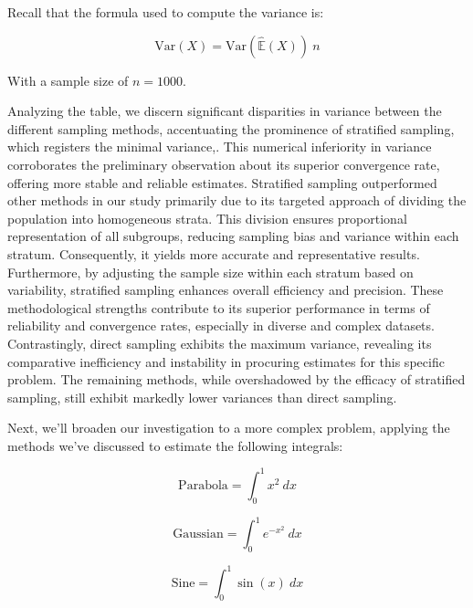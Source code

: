 \documentclass{report}
\begin{document}
Recall that the formula used to compute the variance is:

\begin{equation*} \mathrm{Var}(X) = \mathrm{Var}(\hat{\mathbb{E}}(X)) \ n \end{equation*}

With a sample size of \(n = 1000\).

Analyzing the table, we discern significant disparities in variance between the different sampling methods, accentuating the prominence of stratified sampling, which registers the minimal variance,. This numerical inferiority in variance corroborates the preliminary observation about its superior convergence rate, offering more stable and reliable estimates. Stratified sampling outperformed other methods in our study primarily due to its targeted approach of dividing the population into homogeneous strata. This division ensures proportional representation of all subgroups, reducing sampling bias and variance within each stratum. Consequently, it yields more accurate and representative results. Furthermore, by adjusting the sample size within each stratum based on variability, stratified sampling enhances overall efficiency and precision. These methodological strengths contribute to its superior performance in terms of reliability and convergence rates, especially in diverse and complex datasets. Contrastingly, direct sampling exhibits the maximum variance, revealing its comparative inefficiency and instability in procuring estimates for this specific problem. The remaining methods, while overshadowed by the efficacy of stratified sampling, still exhibit markedly lower variances than direct sampling.

Next, we'll broaden our investigation to a more complex problem, applying the methods we’ve discussed to estimate the following integrals:

\begin{equation} 
	\label{eq:integralvariancereduction1} 
	\text{Parabola} = \int_{0}^{1} x^2 \ dx 
\end{equation}

\begin{equation} 
	\label{eq:integralvariancereduction2} 
	\text{Gaussian} = \int_{0}^{1} e^{-x^2} \ dx
\end{equation}

\begin{equation} 
	\label{eq:integralvariancereduction3} 
	\text{Sine} = \int_{0}^{1} \sin(x) \ dx
\end{equation}
\end{document}
